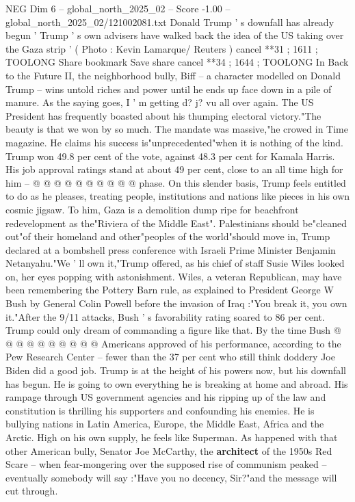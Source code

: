 \begin{textsample}{NEG Dim 6 – global\_north\_2025\_02 – Score -1.00 – global\_north\_2025\_02/121002081.txt}  \label{ex:f6_neg_081}
Donald Trump ' s downfall has already begun ' Trump ' s own advisers have walked back the idea of the US taking over the Gaza strip ' ( Photo : Kevin Lamarque/ Reuters ) cancel **31 ; 1611 ; TOOLONG Share bookmark Save share cancel **34 ; 1644 ; TOOLONG In Back to the Future II, the neighborhood bully, Biff -- a character modelled on Donald Trump -- wins untold riches and power until he ends up face down in a pile of manure.
As the saying goes, I ' m getting d? j? vu all over again.
The US President has frequently boasted about his thumping electoral victory."The beauty is that we won by so much.
The mandate was massive,"he crowed in Time magazine.
He claims his success is"unprecedented"when it is nothing of the kind.
Trump won 49.8 per cent of the vote, against 48.3 per cent for Kamala Harris.
His job approval ratings stand at about 49 per cent, close to an all time high for him -- @ @ @ @ @ @ @ @ @ @ phase.
On this slender basis, Trump feels entitled to do as he pleases, treating people, institutions and nations like pieces in his own cosmic jigsaw.
To him, Gaza is a demolition dump ripe for beachfront redevelopment as the"Riviera of the Middle East".
Palestinians should be"cleaned out"of their homeland and other"peoples of the world"should move in, Trump declared at a bombshell press conference with Israeli Prime Minister Benjamin Netanyahu."We ' ll own it,"Trump offered, as his chief of staff Susie Wiles looked on, her eyes popping with astonishment.
Wiles, a veteran Republican, may have been remembering the Pottery Barn rule, as explained to President George W Bush by General Colin Powell before the invasion of Iraq :"You break it, you own it."After the 9/11 attacks, Bush ' s favorability rating soared to 86 per cent.
Trump could only dream of commanding a figure like that.
By the time Bush @ @ @ @ @ @ @ @ @ @ Americans approved of his performance, according to the Pew Research Center -- fewer than the 37 per cent who still think doddery Joe Biden did a good job.
Trump is at the height of his powers now, but his downfall has begun.
He is going to own everything he is breaking at home and abroad.
His rampage through US government agencies and his ripping up of the law and constitution is thrilling his supporters and confounding his enemies.
He is bullying nations in Latin America, Europe, the Middle East, Africa and the Arctic.
High on his own supply, he feels like Superman.
As happened with that other American bully, Senator Joe McCarthy, the \textbf{architect} of the 1950s Red Scare -- when fear-mongering over the supposed rise of communism peaked -- eventually somebody will say :"Have you no decency, Sir?"and the message will cut through.

\end{textsample}
